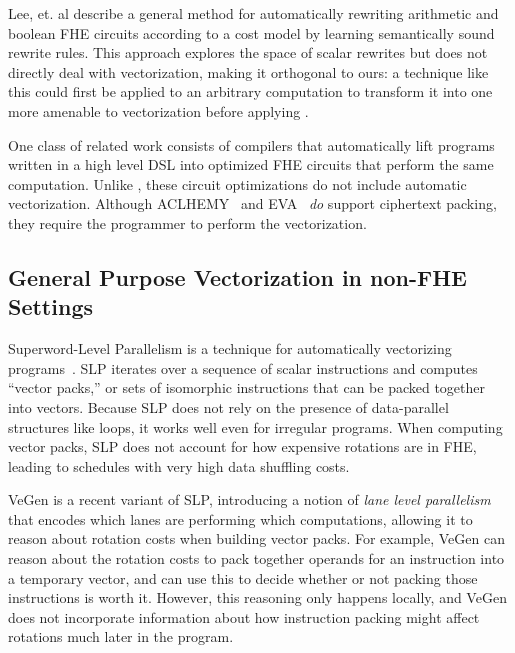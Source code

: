 Lee, et. al \cite{CircuitRewriting} describe a general method for automatically rewriting arithmetic and boolean FHE circuits according to a cost model by learning semantically sound rewrite rules.
This approach explores the space of scalar rewrites but does not directly deal with vectorization, making it orthogonal to ours: a technique like this could first be applied to an arbitrary computation to transform it into one more amenable to vectorization before applying \system.

One class of related work consists of compilers \cite{Ramparts, ALCHEMY, EVA, Cingulata} that automatically lift programs written in a high level DSL into optimized FHE circuits that perform the same computation.
Unlike \system, these circuit optimizations do not include automatic vectorization. Although ACLHEMY~\cite{ALCHEMY} and EVA~\cite{EVA} \textit{do} support ciphertext packing, they require the programmer to perform the vectorization.

\subsection{General Purpose Vectorization in non-FHE Settings}
Superword-Level Parallelism is a technique for automatically vectorizing programs~\cite{SLP}.
SLP iterates over a sequence of scalar instructions and computes ``vector packs,'' or sets of isomorphic instructions that can be packed together into vectors.
Because SLP does not rely on the presence of data-parallel structures like loops, it works well even for irregular programs.
When computing vector packs, SLP does not account for how expensive rotations are in FHE, leading to schedules with very high data shuffling costs. 

VeGen \cite{VeGen} is a recent variant of SLP, introducing a notion of {\em lane level parallelism} that encodes which lanes are performing which computations, allowing it to reason about rotation costs when building vector packs.
For example, VeGen can reason about the rotation costs to pack together operands for an instruction into a temporary vector, and can use this to decide whether or not packing those instructions is worth it.
However, this reasoning only happens locally, and VeGen does not incorporate information about how instruction packing might affect rotations much later in the program.

